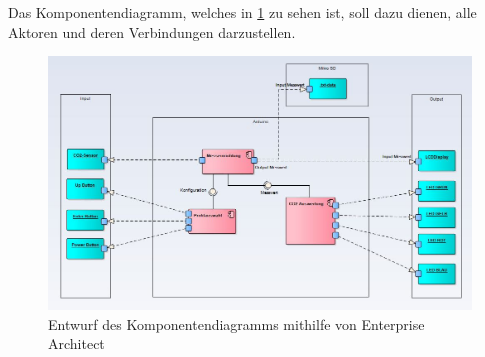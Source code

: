 Das Komponentendiagramm, welches in \ref{fig:KomponentenDiagramm} zu sehen ist, soll dazu dienen, alle Aktoren und deren Verbindungen darzustellen. \\

\begin{figure}[!hbt]
	\centering
	\includegraphics[width=0.9\linewidth]{Images/Komponentendiagramm}
	\caption{Entwurf des Komponentendiagramms mithilfe von Enterprise Architect}
	\label{fig:KomponentenDiagramm}
\end{figure}